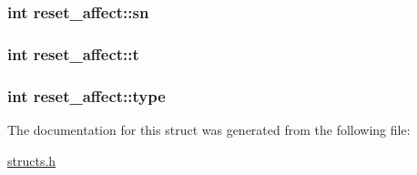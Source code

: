 \hypertarget{structreset__affect_aefffebaff8fd9c83f154b8cda8f85deb}{
\subsubsection[{sn}]{\setlength{\rightskip}{0pt plus 5cm}int reset\-\_\-affect\-::sn}}\label{structreset__affect_aefffebaff8fd9c83f154b8cda8f85deb}
\hypertarget{structreset__affect_aa283ebf1baee01cf7523732d45248fbe}{
\subsubsection[{t}]{\setlength{\rightskip}{0pt plus 5cm}int reset\-\_\-affect\-::t}}\label{structreset__affect_aa283ebf1baee01cf7523732d45248fbe}
\hypertarget{structreset__affect_a1b74a5ae3578173fe2d55ab808f9207f}{
\subsubsection[{type}]{\setlength{\rightskip}{0pt plus 5cm}int reset\-\_\-affect\-::type}}\label{structreset__affect_a1b74a5ae3578173fe2d55ab808f9207f}


The documentation for this struct was generated from the following file\-:\begin{DoxyCompactItemize}
\item 
\hyperlink{structs_8h}{structs.\-h}\end{DoxyCompactItemize}
